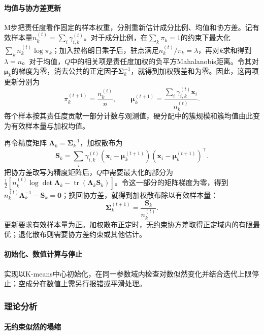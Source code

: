 \paragraph{均值与协方差更新}

M步把责任度看作固定的样本权重，分别重新估计成分比例、均值和协方差。记有效样本量$n_k^{(t)}=\sum_i\gamma_{i,k}^{(t)}$。对于成分比例，在$\sum_k\pi_k=1$的约束下最大化$\sum_k n_k^{(t)}\log\pi_k$；加入拉格朗日乘子后，驻点满足$n_k^{(t)}/\pi_k=\lambda$，再对$k$求和得到$\lambda=n$。对于均值，$Q$中的相关项是责任度加权的负平方Mahalanobis距离。令其对$\bm\mu_k$的梯度为零，消去公共的正定因子$\bm\Sigma_k^{-1}$，就得到加权残差和为零。因此，这两项更新分别为
\begin{equation}
 \pi_k^{(t+1)}=\frac{n_k^{(t)}}{n},\qquad
 \bm{\mu}_k^{(t+1)}
 =\frac{\sum_i\gamma_{i,k}^{(t)}\bm{x}_i}{n_k^{(t)}}.
 \label{eq:clustering-gmm-mean}
\end{equation}
每个样本按其责任度贡献一部分计数与观测值，硬分配中的簇规模和簇均值由此变为有效样本量与加权均值。

再令精度矩阵 $\bm{\Lambda}_k=\bm{\Sigma}_k^{-1}$，加权散布为
\[
 \bm{S}_k=\sum_i\gamma_{i,k}^{(t)}
 (\bm{x}_i-\bm{\mu}_k^{(t+1)})
 (\bm{x}_i-\bm{\mu}_k^{(t+1)})^\top.
\]
把协方差改写为精度矩阵后，$Q$中需要最大化的部分为$\tfrac12[n_k^{(t)}\log\det\bm{\Lambda}_k-\operatorname{tr}(\bm{\Lambda}_k\bm{S}_k)]$。令这一部分的矩阵梯度为零，得到$n_k^{(t)}\bm{\Lambda}_k^{-1}-\bm{S}_k=\bm{0}$；换回协方差，就得到加权散布除以有效样本量：
\begin{equation}
 \bm{\Sigma}_k^{(t+1)}
 =\frac{\bm{S}_k}{n_k^{(t)}}.
 \label{eq:clustering-gmm-covariance}
\end{equation}
更新要求有效样本量为正。加权散布正定时，无约束协方差取得正定域内的有限最优；退化散布则需要协方差约束或其他估计。

\paragraph{初始化、数值计算与停止}

实现以K-means中心初始化，在同一参数域内检查对数似然变化并结合迭代上限停止；空成分在数值上需另行报错或平滑处理。

\subsubsection{理论分析}

\paragraph{无约束似然的塌缩}

